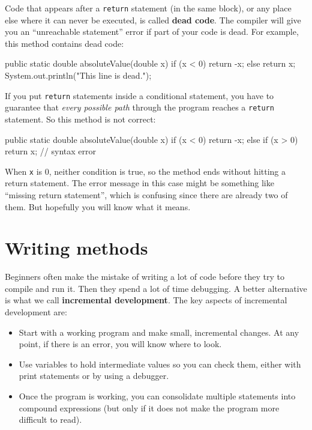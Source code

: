 \documentclass[12pt]{book}
\theoremstyle{exercise}
\newcommand{\java}[1]{\verb"#1"}
\begin{document}

Code that appears after a \java{return} statement (in the same block), or any place else where it can never be executed, is called {\bf dead code}.
The compiler will give you an ``unreachable statement'' error if part of your code is dead.
For example, this method contains dead code:

\begin{code}
    public static double absoluteValue(double x) {
        if (x < 0) {
            return -x;
        } else {
            return x;
        }
        System.out.println("This line is dead.");
    }
\end{code}

If you put \java{return} statements inside a conditional statement, you have to guarantee that {\em every possible path} through the program reaches a \java{return} statement.
So this method is not correct:

\begin{code}
    public static double absoluteValue(double x) {
        if (x < 0) {
            return -x;
        } else if (x > 0) {
            return x;
        }
        // syntax error
    }
\end{code}

When \java{x} is 0, neither condition is true, so the method ends without hitting a return statement.
The error message in this case might be something like ``missing return statement'', which is confusing since there are already two of them.
But hopefully you will know what it means.


\section{Writing methods}
\label{distance}


Beginners often make the mistake of writing a lot of code before they try to compile and run it.
Then they spend a lot of time debugging.
A better alternative is what we call {\bf incremental development}.
The key aspects of incremental development are:

\begin{itemize}

\item Start with a working program and make small, incremental changes.
At any point, if there is an error, you will know where to look.

\item Use variables to hold intermediate values so you can check them, either with print statements or by using a debugger.

\item Once the program is working, you can consolidate multiple statements into compound expressions (but only if it does not make the program more difficult to read).

\end{itemize}
\end{document}
